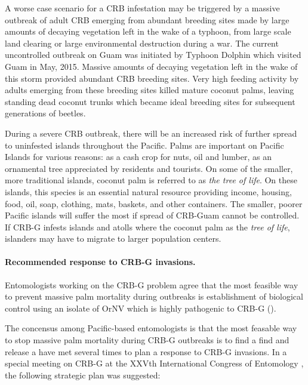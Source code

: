 \documentclass[12pt,letterpaper,english,bibliography=totocnumbered, abstract=on]{scrartcl}
\begin{document}
A worse case scenario for a CRB infestation may be triggered by a massive outbreak of adult
CRB emerging from abundant breeding sites made by large amounts of
decaying vegetation left in the wake of a typhoon, from large scale land clearing or large environmental destruction during a war.  The current uncontrolled outbreak on Guam was initiated
by Typhoon Dolphin which visited Guam in May, 2015. Massive amounts of decaying vegetation left in the wake of this storm provided abundant CRB breeding sites. Very high feeding activity by adults emerging 
from these breeding sites killed mature coconut palms, leaving standing dead coconut trunks
which became ideal breeding sites for subsequent generations of beetles. 

During a severe CRB outbreak, there will be an increased risk of further
spread to uninfested islands throughout the Pacific. Palms are important
on Pacific Islands for various reasons: as a cash crop for nuts, oil
and lumber, as an ornamental tree appreciated by residents and tourists.
On some of the smaller, more traditional islands, coconut palm
is referred to as \emph{the tree of life}. On these islands, this species is an
essential natural resource providing income, housing, food, oil, soap,
clothing, mats, baskets, and other containers. The smaller, poorer
Pacific islands will suffer the most if spread of CRB-Guam cannot
be controlled. If CRB-G infests islands and atolls where the coconut
palm as the \emph{tree of life}, islanders may have to migrate to
larger population centers.

\paragraph*{Recommended response to CRB-G invasions.}

Entomologists working on the CRB-G problem agree that the most feasible
way to prevent massive palm mortality during outbreaks is establishment
of biological control using an isolate of OrNV which is highly pathogenic
to CRB-G (\cite{jackson_need_2015,vaqalo_pest_2015}).

The concensus among Pacific-based entomologists is that the most feasable
way to stop massive palm mortality during CRB-G outbreaks is to find
a find and release a have met several times to plan a response to
CRB-G invasions. In a special meeting on CRB-G at the XXVth International
Congress of Entomology 
, the following strategic
plan was suggested:
\end{document}
